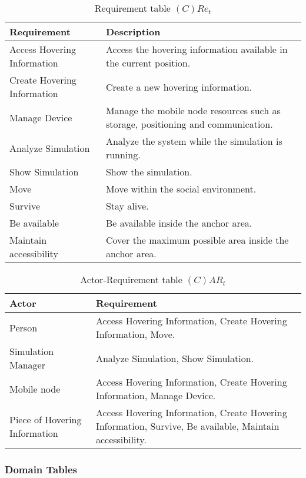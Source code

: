 \begin{table}[H]
	\centering
	\begin{tabular}{|p{4cm}|p{8cm}|}
			\hline
			\textbf{Requirement} & \textbf{Description} \\
			\hline
      Access Hovering Information & Access the hovering information
      available in the current position. \\
			\hline
			Create Hovering Information & Create a new hovering information. \\
			\hline
			Manage Device & Manage the mobile node resources such as storage,
			positioning and communication.  \\
			\hline
			Analyze Simulation & Analyze the system while the simulation is running.
			\\
			\hline
			Show Simulation & Show the simulation. \\
			\hline
			Move & Move within the social environment. \\
			\hline
			Survive & Stay alive. \\
			\hline
			Be available & Be available inside the anchor area. \\
			\hline
			Maintain accessibility & Cover the maximum possible area inside the
			anchor area. \\
			\hline
		\end{tabular}
	\caption{Requirement table $(C)Re_t$}
	\label{tab:cact}
\end{table}

\begin{table}[H]
	\centering
	\begin{tabular}{|p{4cm}|p{8cm}|}
			\hline
			\textbf{Actor} & \textbf{Requirement} \\
			\hline
			Person & Access Hovering Information, Create Hovering Information, Move. \\
			\hline
			Simulation Manager & Analyze Simulation, Show Simulation. \\
			\hline
			Mobile node & Access Hovering Information, Create Hovering Information, Manage Device. \\
			\hline
			Piece of Hovering Information & Access Hovering Information, Create Hovering Information,
			Survive, Be available, Maintain accessibility. \\
			\hline
		\end{tabular}
	\caption{Actor-Requirement table $(C)AR_t$}
	\label{tab:cart}
\end{table}

\subsubsection{Domain Tables}

